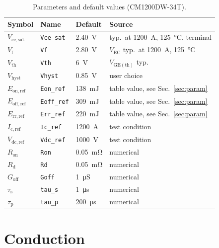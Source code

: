 \documentclass[11pt,a4paper]{article}
\newcommand{\code}[1]{\texttt{\small #1}}
\begin{document}
\begin{table}[h]
\centering
\caption{Parameters and default values (CM1200DW-34T).}
\begin{tabular}{llll}
\toprule
Symbol & Name & Default & Source \\
\midrule
$V_\mathrm{ce,sat}$ & \code{Vce\_sat} & \SI{2.40}{\volt} &
  typ.\ at \SI{1200}{\ampere}, \SI{125}{\degreeCelsius}, terminal \\
$V_\mathrm{f}$ & \code{Vf} & \SI{2.80}{\volt} &
  $V_\mathrm{EC}$ typ.\ at \SI{1200}{\ampere}, \SI{125}{\degreeCelsius} \\
$V_\mathrm{th}$ & \code{Vth} & \SI{6}{\volt} & $V_\mathrm{GE(th)}$ typ. \\
$V_\mathrm{hyst}$ & \code{Vhyst} & \SI{0.85}{\volt} & user choice \\
$E_\mathrm{on,ref}$ & \code{Eon\_ref} & \SI{138}{\milli\joule} &
  table value, see Sec.~\ref{sec:param} \\
$E_\mathrm{off,ref}$ & \code{Eoff\_ref} & \SI{309}{\milli\joule} &
  table value, see Sec.~\ref{sec:param} \\
$E_\mathrm{rr,ref}$ & \code{Err\_ref} & \SI{220}{\milli\joule} &
  table value, see Sec.~\ref{sec:param} \\
$I_\mathrm{c,ref}$ & \code{Ic\_ref} & \SI{1200}{\ampere} & test condition \\
$V_\mathrm{dc,ref}$ & \code{Vdc\_ref} & \SI{1000}{\volt} & test condition \\
$R_\mathrm{on}$ & \code{Ron} & \SI{0.05}{\milli\ohm} & numerical \\
$R_\mathrm{d}$ & \code{Rd} & \SI{0.05}{\milli\ohm} & numerical \\
$G_\mathrm{off}$ & \code{Goff} & \SI{1}{\micro\siemens} & numerical \\
$\tau_\mathrm{s}$ & \code{tau\_s} & \SI{1}{\micro\second} & numerical \\
$\tau_\mathrm{p}$ & \code{tau\_p} & \SI{200}{\micro\second} & numerical \\
\bottomrule
\end{tabular}
\end{table}

\section{Conduction}
\end{document}
